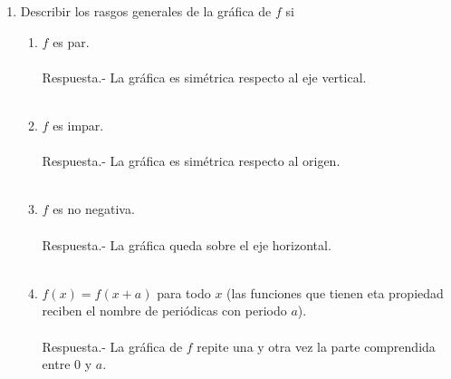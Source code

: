 \begin{enumerate}
\begin{enumerate}[\bfseries (i)]
    \end{enumerate}

    \item Describir los rasgos generales de la gráfica de $f$ si
    \begin{enumerate}[\bfseries (i)]

	\item $f$ es par.\\\\
	    Respuesta.-\; La gráfica es simétrica respecto al eje vertical.\\\\

	\item $f$ es impar.\\\\
	    Respuesta.-\; La gráfica es simétrica respecto al origen.\\\\

	\item $f$ es no negativa.\\\\
	    Respuesta.-\; La gráfica queda sobre el eje horizontal.\\\\

	\item $f(x)=f(x+a)$ para todo $x$ (las funciones que tienen eta propiedad reciben el nombre de periódicas con periodo $a$).\\\\
	    Respuesta.-\; La gráfica de $f$ repite una y otra vez la parte comprendida entre $0$ y $a$.\\\\

    \end{enumerate}


\end{enumerate}
